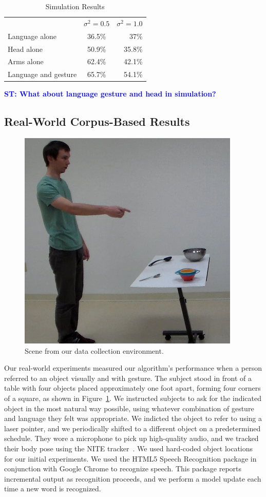 \documentclass[letterpaper, 10 pt, conference]{ieeeconf}
\newcommand{\stnote}[1]{\textcolor{Blue}{\textbf{ST: #1}}}
\begin{document}
\begin{table}
\centering
\caption{Simulation Results\label{table:sim_results}}
\begin{tabular}{lcr}
& $\sigma^2 = 0.5$ & $\sigma^2 = 1.0$\\
Language alone &  36.5\% & 37\%\\
Head alone & 50.9\% & 35.8\%\\
Arms alone & 62.4\% & 42.1\%\\
Language and gesture &  65.7\% & 54.1\%
\end{tabular}
\stnote{What about language gesture and head in simulation?}
\end{table}

\subsection{Real-World Corpus-Based Results}

\begin{figure}
\centering
\includegraphics[width=0.5\linewidth]{figures/dataset.png}
\caption{Scene from our data collection environment.\label{fig:corpus_scene}}
\end{figure}

Our real-world experiments measured our algorithm's performance when a
person referred to an object visually and with gesture.  The subject
stood in front of a table with four objects placed approximately one
foot apart, forming four corners of a square, as shown in
Figure~\ref{fig:corpus_scene}.  We instructed subjects to ask for the
indicated object in the most natural way possible, using whatever
combination of gesture and language they felt was appropriate. We
indicted the object to refer to using a laser pointer, and we
periodically shifted to a different object on a predetermined
schedule.  They wore a microphone to pick up high-quality audio, and
we tracked their body pose using the NITE tracker~\citep{openni}.  We
used hard-coded object locations for our initial experiments.  We used
the HTML5 Speech Recognition package in conjunction with Google Chrome
to recognize speech.  This package reports incremental output as
recognition proceeds, and we perform a model update each time a new
word is recognized.
\end{document}
